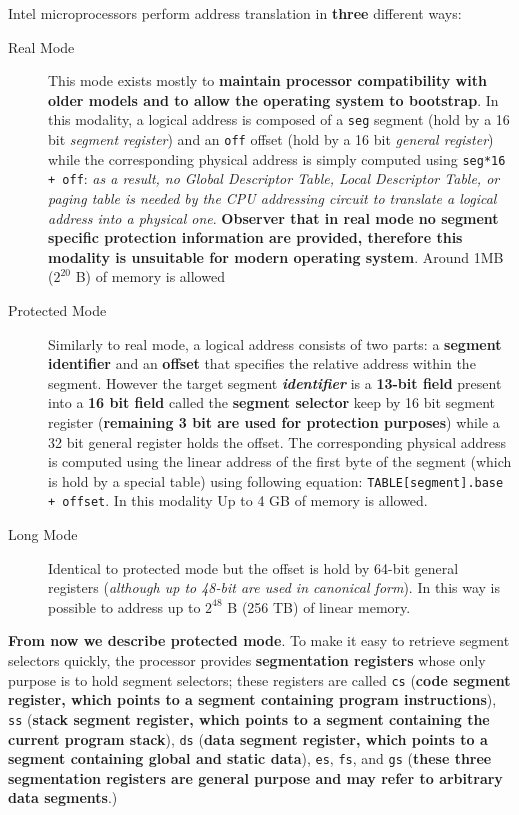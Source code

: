 \documentclass[10pt,a4paper]{article}
\begin{document}
Intel microprocessors perform address translation in \textbf{three} different ways:
\begin{description}
\item[Real Mode] This mode exists mostly to \textbf{maintain processor compatibility with older models and to allow the operating system to bootstrap}. In this modality, a logical address is composed of a \texttt{seg} segment (hold by a 16 bit \textit{segment register}) and an \texttt{off} offset (hold by a 16 bit \textit{general register}) while the corresponding physical address is simply computed using \texttt{seg*16 + off}: \textit{as a result, no Global Descriptor Table, Local Descriptor Table, or paging table is needed by the CPU addressing circuit to translate a logical address into a physical one}. \textbf{Observer that in real mode no segment specific protection information are provided, therefore this modality is unsuitable for modern operating system}. Around 1MB ($2^20$ B) of memory is allowed
\item[Protected Mode] Similarly to real mode, a logical address consists of two parts: a \textbf{segment identifier} and an \textbf{offset} that specifies the relative address within the segment. However the target segment \textit{\textbf{identifier}} is a \textbf{13-bit field} present into a \textbf{16 bit field} called the \textbf{segment selector} keep by 16 bit segment register (\textbf{remaining 3 bit are used for protection purposes}) while a 32 bit general register holds the offset. The corresponding physical address is computed using the linear address of the first byte of the segment (which is hold by a special table) using following equation: \texttt{TABLE[segment].base + offset}. In this modality Up to 4 GB of memory is allowed.
\item[Long Mode] Identical to protected mode but the offset is hold by 64-bit general registers (\textit{although up to 48-bit are used in canonical form}). In this way is possible to address up to $2^{48}$ B (256 TB) of linear memory.
\end{description}

\textbf{From now we describe protected mode}. To make it easy to retrieve segment selectors quickly, the processor provides \textbf{segmentation registers} whose only purpose is to hold segment selectors; these registers are called \texttt{cs} (\textbf{code segment register, which points to a segment containing program instructions}), \texttt{ss} (\textbf{stack segment register, which points to a segment containing the current program stack}), \texttt{ds} (\textbf{data segment register, which points to a segment containing global and static data}), \texttt{es}, \texttt{fs}, and \texttt{gs} (\textbf{these three segmentation registers are general purpose and may refer to arbitrary data segments}.)
\end{document}

